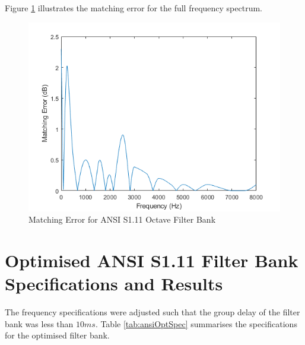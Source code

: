 \documentclass[11pt,onecolumn]{witseiepaper}
\begin{document}
\begin{appendices}
\noindent Figure \ref{fig:ansiOctMatErr} illustrates the matching error for the full frequency spectrum.

\begin{figure}[h]
\centering
\includegraphics[width=0.6\linewidth]{ansiOctMatErr.PNG}
\caption{Matching Error for ANSI S1.11 Octave Filter Bank}
\label{fig:ansiOctMatErr}
\end{figure} 


\section{Optimised ANSI S1.11 Filter Bank Specifications and Results}
\label{app:ansiOptSpec}

\noindent The frequency specifications were adjusted such that the group delay of the filter bank was less than $10ms$. Table \ref{tab:ansiOptSpec} summarises the specifications for the optimised filter bank.


\end{appendices}
\end{document}
